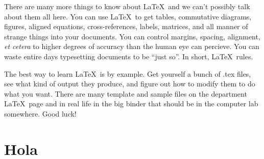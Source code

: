 \documentclass{article}
\begin{document}
There are many more things to know about \LaTeX\ and we can't 
possibly talk about them all here.
You can use \LaTeX\ to get tables, commutative diagrams, figures, 
aligned equations, cross-references, labels, matrices, and all manner 
of strange things into your documents.  You can control margins, 
spacing, alignment, {\it et cetera} to higher degrees of accuracy than 
the human eye can percieve.  You can waste entire days typesetting 
documents to be ``just so''.  In short, \LaTeX\ rules.

The best way to learn \LaTeX\ is by example. Get yourself a bunch
of .tex files, see what kind of output they produce, and figure out how
to modify them to do what you want.  There are many template and 
sample files on the department \LaTeX\ page and in real life in the 
big binder that should be in the computer lab somewhere.  Good luck!


\section{Hola}
\end{document}
